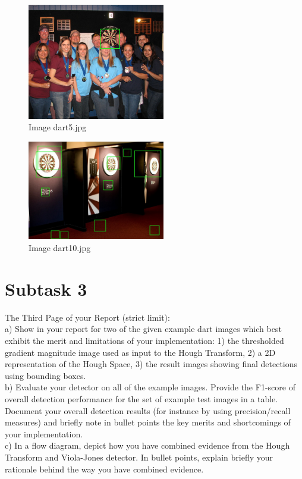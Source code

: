 \documentclass[conference]{IEEEtran}
\begin{document}
\begin{figure}[ht!]
	\centering
	\includegraphics[width=60mm]{img/Viola_Jones_Darts/detected_dart5.jpg}
	\caption{Image dart5.jpg \label{img_dart_5}}
\end{figure}

\begin{figure}[ht!]
	\centering
	\includegraphics[width=60mm]{img/Viola_Jones_Darts/detected_dart10.jpg}
	\caption{Image dart10.jpg \label{img_dart_10}}
\end{figure}


\section{Subtask 3}

The Third Page of your Report (strict limit):\\
a) Show in your report for two of the given example dart
images which best exhibit the merit and limitations of your
implementation: 1) the thresholded gradient magnitude
image used as input to the Hough Transform, 2) a 2D
representation of the Hough Space, 3) the result images
showing final detections using bounding boxes.\\
b) Evaluate your detector on all of the example images.
Provide the F1-score of overall detection performance for
the set of example test images in a table. Document your
overall detection results (for instance by using
precision/recall measures) and briefly note in bullet points
the key merits and shortcomings of your implementation.\\
c) In a flow diagram, depict how you have combined
evidence from the Hough Transform and Viola-Jones
detector. In bullet points, explain briefly your rationale
behind the way you have combined evidence.
\end{document}
